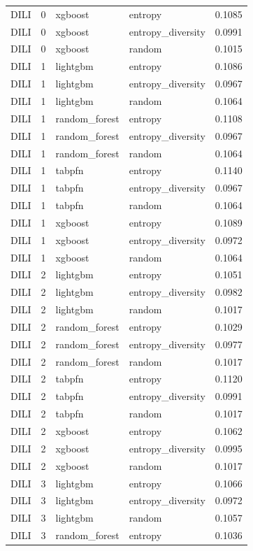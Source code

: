 \begin{tabular}{lrllr}
DILI & 0 & xgboost & entropy & 0.1085 \\
DILI & 0 & xgboost & entropy_diversity & 0.0991 \\
DILI & 0 & xgboost & random & 0.1015 \\
DILI & 1 & lightgbm & entropy & 0.1086 \\
DILI & 1 & lightgbm & entropy_diversity & 0.0967 \\
DILI & 1 & lightgbm & random & 0.1064 \\
DILI & 1 & random_forest & entropy & 0.1108 \\
DILI & 1 & random_forest & entropy_diversity & 0.0967 \\
DILI & 1 & random_forest & random & 0.1064 \\
DILI & 1 & tabpfn & entropy & 0.1140 \\
DILI & 1 & tabpfn & entropy_diversity & 0.0967 \\
DILI & 1 & tabpfn & random & 0.1064 \\
DILI & 1 & xgboost & entropy & 0.1089 \\
DILI & 1 & xgboost & entropy_diversity & 0.0972 \\
DILI & 1 & xgboost & random & 0.1064 \\
DILI & 2 & lightgbm & entropy & 0.1051 \\
DILI & 2 & lightgbm & entropy_diversity & 0.0982 \\
DILI & 2 & lightgbm & random & 0.1017 \\
DILI & 2 & random_forest & entropy & 0.1029 \\
DILI & 2 & random_forest & entropy_diversity & 0.0977 \\
DILI & 2 & random_forest & random & 0.1017 \\
DILI & 2 & tabpfn & entropy & 0.1120 \\
DILI & 2 & tabpfn & entropy_diversity & 0.0991 \\
DILI & 2 & tabpfn & random & 0.1017 \\
DILI & 2 & xgboost & entropy & 0.1062 \\
DILI & 2 & xgboost & entropy_diversity & 0.0995 \\
DILI & 2 & xgboost & random & 0.1017 \\
DILI & 3 & lightgbm & entropy & 0.1066 \\
DILI & 3 & lightgbm & entropy_diversity & 0.0972 \\
DILI & 3 & lightgbm & random & 0.1057 \\
DILI & 3 & random_forest & entropy & 0.1036 \\

\end{tabular}
